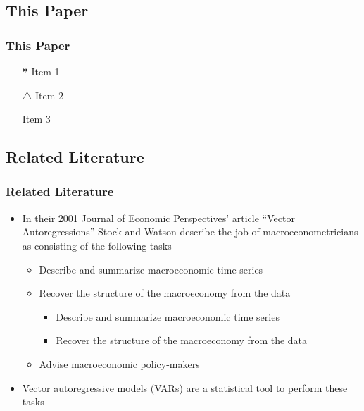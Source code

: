 \documentclass[11pt]{beamer}
\begin{document}
	\begin{frame}
		\section[]{This Paper}
		\frametitle{\bfseries This Paper}
		
		\begin{itemize}
			\item[\textbf{*}] Item 1
			\item[$\triangle$] Item 2
			\item[\rhd] Item 3
		\end{itemize}

	\end{frame}

\begin{frame}
	\section[Literature]{Related Literature}
	\frametitle{\bfseries Related Literature}
	
	\begin{itemize}
		\item In their 2001 Journal of Economic Perspectives' article ``Vector Autoregressions'' Stock and
		Watson describe the job of macroeconometricians as consisting of the following tasks
		
		\begin{itemize}
			\item Describe and summarize macroeconomic time series
			\item Recover the structure of the macroeconomy from the data
					
			\begin{itemize}
				\item Describe and summarize macroeconomic time series
				\item Recover the structure of the macroeconomy from the data
			\end{itemize}
			\item Advise macroeconomic policy-makers
		\end{itemize}
		\item Vector autoregressive models (VARs) are a statistical tool to perform these tasks

	\end{itemize}

\end{frame}
\end{document}
